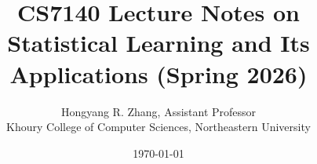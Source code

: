 \documentclass[11pt]{article}
\begin{document}
\title{CS7140 Lecture Notes on Statistical Learning and Its Applications (Spring 2026)}
\author{Hongyang R. Zhang, Assistant Professor\\Khoury College of Computer Sciences, Northeastern University}
\date{\today}
\maketitle

\tableofcontents
\newpage

\newpage

\newpage

\newpage

\newpage

\newpage

\begin{refcontext}[sorting=nyt]
\printbibliography
\end{refcontext}
\end{document}

